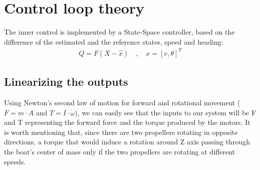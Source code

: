 \section{Control loop theory}

The inner control is implemented by a State-Space controller, based on the difference of the estimated and the reference states, speed and heading:
\begin{align}
Q = F(X-\hat{x}) \quad , \quad x = [v, \theta]^T
\end{align}

\subsection{Linearizing the outputs}

Using Newton's second law of motion for forward  and rotational movement ($F = m \cdot A$ and $T = I \cdot \dot{\omega}$), we can easily see that the inputs to our system will be F and T representing the forward force and the torque produced by the motors. It is worth mentioning that, since there are two propellers rotating in opposite directions, a torque that would induce a rotation around Z axis passing through the boat's center of mass only if the two propellers are rotating at different speeds.

